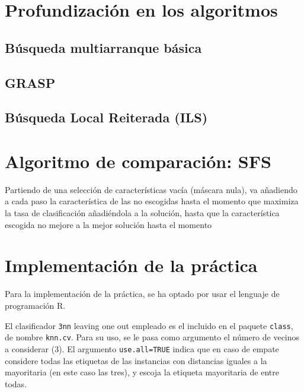 \documentclass[a4paper,11pt]{article}
\begin{document}
\section{Profundización en los algoritmos}
\subsection{Búsqueda multiarranque básica}


\subsection{GRASP}


\subsection{Búsqueda Local Reiterada (ILS)}


\section{Algoritmo de comparación: SFS}
\small{\texttt{}}

Partiendo de una selección de características vacía (máscara nula), va añadiendo a cada paso la característica
de las no escogidas hasta el momento que maximiza la tasa de clasificación añadiéndola a la solución, hasta
que la característica escogida no mejore a la mejor solución hasta el momento

\section{Implementación de la práctica}
Para la implementación de la práctica, se ha optado por usar el lenguaje de programación R. 

El clasificador \texttt{3nn} leaving one out empleado es el incluido en el paquete \texttt{class}, de nombre
\texttt{knn.cv}. Para su uso, se le pasa como argumento el número de vecinos a considerar (3). El argumento 
\texttt{use.all=TRUE} indica que en caso de empate considere todas las etiquetas de las instancias con distancias 
iguales a la mayoritaria (en este caso las tres), y escoja la etiqueta mayoritaria de entre todas. 
\end{document}
